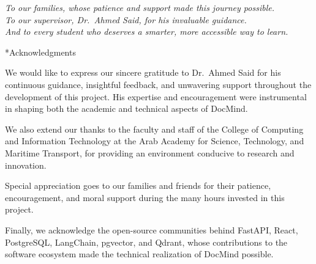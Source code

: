 \documentclass[12pt, a4paper, oneside]{report}
\makeatletter
\newcommand{\chapformat}[1]{%
  \centering
  {\fontsize{14}{17}\selectfont\itshape\addfontfeatures{LetterSpace=3.5}%
    \MakeUppercase{\chaptertitlename}\ \thechapter}\\[24pt]%
  {\fontsize{16}{19}\selectfont\bfseries\addfontfeatures{LetterSpace=0}%
    \MakeUppercase{#1}}%
}
\newcommand{\chapformatstar}[1]{%
  \centering
  {\fontsize{16}{19}\selectfont\bfseries\MakeUppercase{#1}}%
}
\newcommand{\chapterstar}[1]{%
  \clearpage
  \phantomsection
  \edef\@saved@chapcount{\the\value{chapter}}%
  \titleformat{\chapter}[block]{}{}%
    {0pt}{\chapformatstar}%
  \@originalchapter*{#1}%
  \setcounter{chapter}{\@saved@chapcount}%
  \titleformat{\chapter}[block]{}{}%
    {0pt}{\chapformat}%
}
\let\@originalchapter\chapter
\renewcommand{\chapter}{%
  \@ifstar{\chapterstar}{\@originalchapter}%
}
\makeatother
\begin{document}
\vspace*{\fill}
\begin{center}
  \textit{To our families, whose patience and support made this journey possible.}\\[6pt]
  \textit{To our supervisor, Dr.\ Ahmed Said, for his invaluable guidance.}\\[6pt]
  \textit{And to every student who deserves a smarter, more accessible way to learn.}
\end{center}
\vspace*{\fill}

\clearpage

\chapter*{Acknowledgments}

We would like to express our sincere gratitude to Dr.\ Ahmed Said for his continuous guidance, insightful feedback, and unwavering support throughout the development of this project. His expertise and encouragement were instrumental in shaping both the academic and technical aspects of DocMind.

We also extend our thanks to the faculty and staff of the College of Computing and Information Technology at the Arab Academy for Science, Technology, and Maritime Transport, for providing an environment conducive to research and innovation.

Special appreciation goes to our families and friends for their patience, encouragement, and moral support during the many hours invested in this project.

Finally, we acknowledge the open-source communities behind FastAPI, React, PostgreSQL, LangChain, pgvector, and Qdrant, whose contributions to the software ecosystem made the technical realization of DocMind possible.

\clearpage

\begingroup
\setlength{\parskip}{0pt}
\tableofcontents
\endgroup
\clearpage

\clearpage
\listoftables
{}
\clearpage
\end{document}
